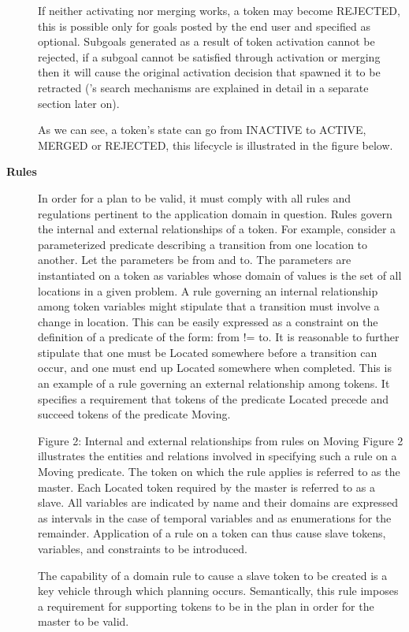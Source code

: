 \begin{description}

If neither activating nor merging works, a token may become REJECTED, this is possible only for goals posted by the end user and specified as optional. Subgoals generated as a result of token activation cannot be rejected, if a subgoal cannot be satisfied through activation or merging then it will cause the original activation decision that spawned it to be retracted (\eu's search mechanisms are explained in detail in a separate section later on).

As we can see, a token's state can go from INACTIVE to ACTIVE, MERGED or REJECTED, this lifecycle is illustrated in the figure below.




\item[\textbf{Rules}] In order for a plan to be valid, it must comply with all rules and
regulations pertinent to the application domain in question. Rules
govern the internal and external relationships of a token. For
example, consider a parameterized predicate describing a transition
from one location to another. Let the parameters be from and to. The
parameters are instantiated on a token as variables whose domain of
values is the set of all locations in a given problem. A rule
governing an internal relationship among token variables might
stipulate that a transition must involve a change in location. This
can be easily expressed as a constraint on the definition of a
predicate of the form: from != to. It is reasonable to further
stipulate that one must be Located somewhere before a transition can
occur, and one must end up Located somewhere when completed. This is
an example of a rule governing an external relationship among
tokens. It specifies a requirement that tokens of the predicate
Located precede and succeed tokens of the predicate Moving.

Figure 2: Internal and external relationships from rules on Moving
Figure 2 illustrates the entities and relations involved in specifying
such a rule on a Moving predicate. The token on which the rule applies
is referred to as the master. Each Located token required by the
master is referred to as a slave. All variables are indicated by name
and their domains are expressed as intervals in the case of temporal
variables and as enumerations for the remainder. Application of a rule
on a token can thus cause slave tokens, variables, and constraints to
be introduced.  

The capability of a domain rule to cause a slave token to be created
is a key vehicle through which planning occurs. Semantically, this
rule imposes a requirement for supporting tokens to be in the plan in
order for the master to be valid. 

\end{description}

